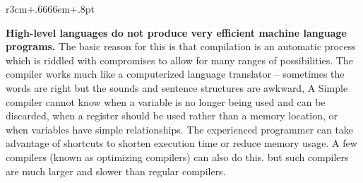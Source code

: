 \documentclass{book}
\begin{document}
\begin{wrapfigure}{r}{3cm+.6666em+.8pt}
\end{wrapfigure}
\textbf{High-level languages do not produce very efficient machine language programs.} The basic reason for this is that compilation is an automatic process which is riddled with compromises to allow for many ranges of possibilities. The compiler works much like a computerized language translator -- sometimes the words are right but the sounds and sentence structures are awkward, A Simple compiler cannot know when a variable is no longer being used and can be discarded, when a register should be used rather than a memory location, or when variables have simple relationships. The experienced programmer can take advantage of shortcuts to shorten execution time or reduce memory usage. A few compilers (known as optimizing compilers) can also do this. but such compilers are much larger and slower than regular compilers.
\end{document}
